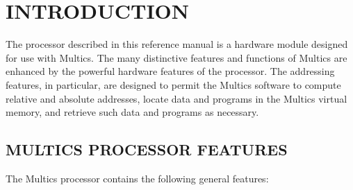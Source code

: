 
\section{INTRODUCTION}

The processor described in this reference manual is a hardware module designed
for use with Multics. The many distinctive features and functions of Multics
are enhanced by the powerful hardware features of the processor. The addressing
features, in particular, are designed to permit the Multics software to compute
relative and absolute addresses, locate data and programs in the Multics
virtual memory, and retrieve such data and programs as necessary.

\subsection{MULTICS PROCESSOR FEATURES}


The Multics processor contains the following general features:

